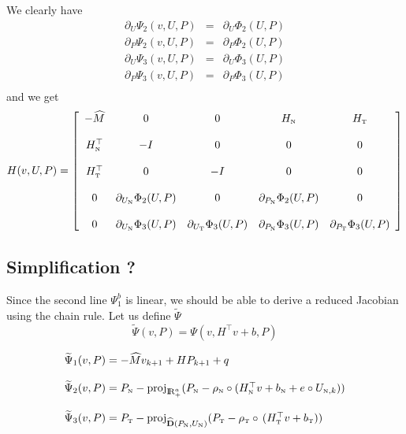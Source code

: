 We clearly have
\begin{equation}
  \label{eq:equivalentJacobian}
  \begin{array}{lcl}
     \partial_{U} \Psi_2(v,U,P) &=& \partial_{U} \Phi_2(U,P) \\
     \partial_{P} \Psi_2(v,U,P) &=& \partial_{P} \Phi_2(U,P) \\
     \partial_{U} \Psi_3(v,U,P) &=& \partial_{U} \Phi_3(U,P) \\
     \partial_{P} \Psi_3(v,U,P) &=& \partial_{P} \Phi_3(U,P) \\
  \end{array}
\end{equation}
and we get
\begin{equation}
  \label{eq:GAC-L4}
   H(v,U,P) =
   \left[\begin{array}{ccccc}
       - \widehat M & 0 & 0 & H_{{\hbox{\tiny{N}}}} & H_{{\hbox{\tiny{T}}}} \\ \\
        H_{{\hbox{\tiny{N}}}}^\top &  - I & 0 & 0 &0 \\ \\
        H_{{\hbox{\tiny{T}}}}^\top &  0  & -I & 0 &0 \\ \\
        0 & \partial_{U_{{\hbox{\tiny{N}}}}} \Phi_2(U,P) & 0 &   \partial_{P_{{\hbox{\tiny{N}}}}} \Phi_2(U,P) & 0 \\ \\
        0 & \partial_{U_{{\hbox{\tiny{N}}}}} \Phi_3(U,P) &  \partial_{U_{{\hbox{\tiny{T}}}}} \Phi_3(U,P) &  \partial_{P_{{\hbox{\tiny{N}}}}} \Phi_3(U,P)  & \partial_{P_{{\hbox{\tiny{T}}}}} \Phi_3(U,P)
   \end{array}\right]
\end{equation}


\subsection{Simplification ?}
Since the second line $\Psi_1^b$ is linear, we should be able to derive a reduced Jacobian using the chain rule. Let us define $\widetilde \Psi$
\begin{equation}
  \label{eq:chainrule}
  \widetilde \Psi(v,P)  = \Psi(v,H^\top v +b,P)
\end{equation}

\begin{equation}
  \label{eq:GAC-L5}
  \begin{array}{l}
  \widetilde \Psi_{1}(v,P) =  - \widehat M v_{k+1}  +  H P_{k+1}  + q \\ \\
  \widetilde \Psi_2(v,P) =  P_{{\hbox{\tiny{N}}}} - \operatorname{proj}_{\mathrm{I\!R}^{a}_+} (P_{{\hbox{\tiny{N}}}} - \rho_{{\hbox{\tiny{N}}}}\circ (H^\top_{{\hbox{\tiny{N}}}}v+b_{{\hbox{\tiny{N}}}} +e \circ  U_{{\hbox{\tiny{N}}},k}) ) \\ \\
  \widetilde \Psi_3(v,P) =  P_{{\hbox{\tiny{T}}}} - \operatorname{proj}_{\widehat {\bf D}(P_{{\hbox{\tiny{N}}}},U_{{\hbox{\tiny{N}}}})} (P_{{{\hbox{\tiny{T}}}}} - \rho_{{\hbox{\tiny{T}}}}\circ \,(H^\top_{\hbox{\tiny{T}}} v + b_{\hbox{\tiny{T}}}) )
\end{array}
\end{equation}

